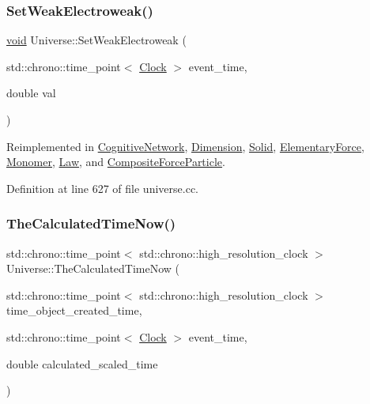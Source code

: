 \mbox{\label{class_universe_a2d3d642bfdc863248e93535832fa4b00}} 
\subsubsection{\texorpdfstring{Set\+Weak\+Electroweak()}{SetWeakElectroweak()}}
{\footnotesize\ttfamily \mbox{\hyperlink{glad_8h_a950fc91edb4504f62f1c577bf4727c29}{void}} Universe\+::\+Set\+Weak\+Electroweak (\begin{DoxyParamCaption}\item[{std\+::chrono\+::time\+\_\+point$<$ \mbox{\hyperlink{universe_8h_a0ef8d951d1ca5ab3cfaf7ab4c7a6fd80}{Clock}} $>$}]{event\+\_\+time,  }\item[{double}]{val }\end{DoxyParamCaption})\hspace{0.3cm}{\ttfamily [virtual]}}



Reimplemented in \mbox{\hyperlink{class_cognitive_network_a116f6818986a622e4a318857859e2495}{Cognitive\+Network}}, \mbox{\hyperlink{class_dimension_a1d2accef9e6adf747f5cc143ae4527c9}{Dimension}}, \mbox{\hyperlink{class_solid_adb34befc66f8c681f3a85c44e0d00e3a}{Solid}}, \mbox{\hyperlink{class_elementary_force_a38d4f86f18a9f84a4198ee43bc90f6b4}{Elementary\+Force}}, \mbox{\hyperlink{class_monomer_ab887d7cfd2ecb557efb3ace59852019c}{Monomer}}, \mbox{\hyperlink{class_law_a65e5e757041c1e72bb046eccbb6d66db}{Law}}, and \mbox{\hyperlink{class_composite_force_particle_a73a3792ae1c334e74f945fea56083f0b}{Composite\+Force\+Particle}}.



Definition at line 627 of file universe.\+cc.

\mbox{\label{class_universe_aa220508c4cc12b02c6fe494622ebb58d}} 
\subsubsection{\texorpdfstring{The\+Calculated\+Time\+Now()}{TheCalculatedTimeNow()}}
{\footnotesize\ttfamily std\+::chrono\+::time\+\_\+point$<$ std\+::chrono\+::high\+\_\+resolution\+\_\+clock $>$ Universe\+::\+The\+Calculated\+Time\+Now (\begin{DoxyParamCaption}\item[{std\+::chrono\+::time\+\_\+point$<$ std\+::chrono\+::high\+\_\+resolution\+\_\+clock $>$}]{time\+\_\+object\+\_\+created\+\_\+time,  }\item[{std\+::chrono\+::time\+\_\+point$<$ \mbox{\hyperlink{universe_8h_a0ef8d951d1ca5ab3cfaf7ab4c7a6fd80}{Clock}} $>$}]{event\+\_\+time,  }\item[{double}]{calculated\+\_\+scaled\+\_\+time }\end{DoxyParamCaption})}



